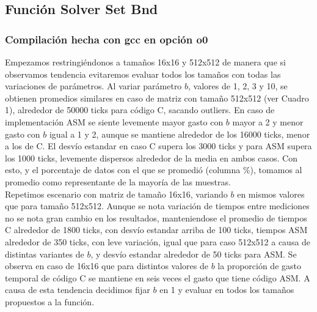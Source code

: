  

 
\subsection{Función Solver Set Bnd }
 \subsubsection{Compilación hecha con gcc en opción o0} 
Empezamos restringiéndonos a tamaños 16x16 y 512x512 de manera que si observamos tendencia evitaremos evaluar todos los tamaños con todas las variaciones de parámetros. Al variar parámetro $b$, valores de 1, 2, 3 y 10, se obtienen promedios similares en caso de matriz con tamaño 512x512 (ver Cuadro 1), alrededor de 50000 ticks para código C, sacando outliers. En caso de implementación ASM se siente levemente mayor gasto con $b$ mayor a 2 y menor gasto con $b$ igual a 1 y 2, aunque se mantiene alrededor de los 16000 ticks, menor a los de C. El desvío estandar en caso C supera los 3000 ticks y para ASM supera los 1000 ticks, levemente dispersos alrededor de la media en ambos casos. Con esto, y el porcentaje de datos con el que se promedió (columna $\%$), tomamos al promedio como representante de la mayoría de las muestras.\\
Repetimos escenario con matriz de tamaño 16x16, variando $b$ en mismos valores que para tamaño 512x512. Aunque se nota 
variación de tiempos entre mediciones no se nota gran cambio en los resultados, manteniendose el promedio de tiempos C alrededor de 1800 ticks, con desvío estandar arriba de 100 ticks, tiempos ASM alrededor de 350 ticks, con leve variación, igual que para caso 512x512 a causa de distintas variantes de $b$, y desvío estandar alrededor de 50 ticks para ASM.
Se observa en caso de 16x16 que para distintos valores de $b$ la proporción de gasto temporal de código C se mantiene en 
seis veces el gasto que tiene código ASM. A causa de esta tendencia decidimos fijar $b$ en 1 y evaluar en todos los tamaños propuestos a la función. 
\newline


